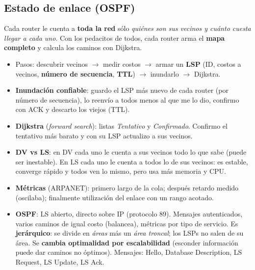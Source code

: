 \documentclass[10pt,a4paper]{article}
\newcommand{\term}[1]{\textbf{\color{azul}#1}}
\begin{document}
\subsection{Estado de enlace (OSPF)}
\begin{idea}
Cada router le cuenta a \textbf{toda la red} sólo \emph{quiénes son sus vecinos y cuánto cuesta llegar a cada uno}. Con los pedacitos de todos,
cada router arma el \textbf{mapa completo} y calcula los caminos con Dijkstra.
\end{idea}
\begin{itemize}
  \item Pasos: descubrir vecinos $\to$ medir costos $\to$ armar un \term{LSP} (ID, costos a vecinos, \textbf{número de secuencia}, \textbf{TTL}) $\to$ inundarlo $\to$ Dijkstra.
  \item \term{Inundación confiable}: guardo el LSP más nuevo de cada router (por número de secuencia), lo reenvío a todos menos al que me lo dio, confirmo con ACK y descarto los viejos (TTL).
  \item \term{Dijkstra} (\emph{forward search}): listas \emph{Tentativo} y \emph{Confirmado}. Confirmo el tentativo más barato y con su LSP actualizo a sus vecinos.
  \item \textbf{DV vs LS}: en DV cada uno le cuenta a sus vecinos todo lo que sabe (puede ser inestable). En LS cada uno le cuenta a todos lo de sus vecinos: es estable, converge rápido y todos ven lo mismo, pero usa más memoria y CPU.
  \item \textbf{Métricas} (ARPANET): primero largo de la cola; después retardo medido (oscilaba); finalmente utilización del enlace con un rango acotado.
  \item \term{OSPF}: LS abierto, directo sobre IP (protocolo 89). Mensajes autenticados, varios caminos de igual costo (balancea), métricas por tipo de servicio.
        Es \textbf{jerárquico}: se divide en \emph{áreas} más un \emph{área troncal}; los LSPs no salen de su área. Se \textbf{cambia optimalidad por escalabilidad} (esconder información puede dar caminos no óptimos).
        Mensajes: Hello, Database Description, LS Request, LS Update, LS Ack.
\end{itemize}
\end{document}
